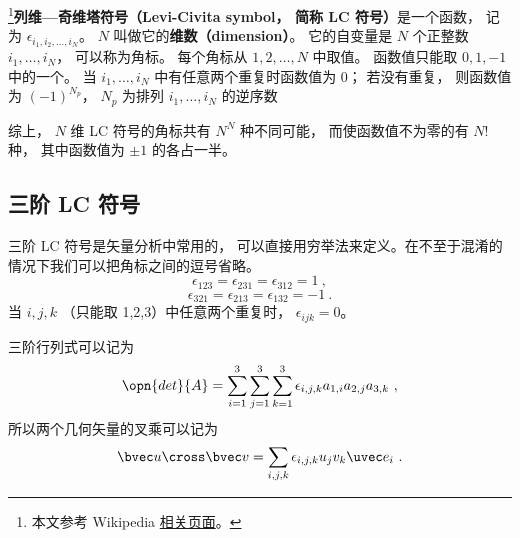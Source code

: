 

\footnote{本文参考 Wikipedia \href{https://en.wikipedia.org/wiki/Levi-Civita_symbol}{相关页面}。}\textbf{列维—奇维塔符号（Levi-Civita symbol， 简称 LC 符号）}是一个函数， 记为 $\epsilon_{i_1, i_2, \dots, i_N}$。 $N$ 叫做它的\textbf{维数（dimension）}。 它的自变量是 $N$ 个正整数 $i_1, \dots, i_N$， 可以称为角标。 每个角标从 $1, 2, \dots, N$ 中取值。 函数值只能取 $0, 1, -1$ 中的一个。 当 $i_1, \dots, i_N$ 中有任意两个重复时函数值为 0； 若没有重复， 则函数值为 $(-1)^{N_p}$， $N_p$ 为排列 $i_1, \dots, i_N$ 的逆序数

综上， $N$ 维 LC 符号的角标共有 $N^N$ 种不同可能， 而使函数值不为零的有 $N!$ 种， 其中函数值为 $\pm 1$ 的各占一半。

\subsection{三阶 LC 符号}
三阶 LC 符号是矢量分析中常用的， 可以直接用穷举法来定义。在不至于混淆的情况下我们可以把角标之间的逗号省略。
\begin{equation}
\epsilon_{123} = \epsilon_{231} = \epsilon_{312} = 1~,
\end{equation}
\begin{equation}
\epsilon_{321} = \epsilon_{213} = \epsilon_{132} = -1~.
\end{equation}
当 $i,j,k$ （只能取 1,2,3）中任意两个重复时， $\epsilon_{ijk} = 0$。

三阶行列式可以记为
\begin{equation}
\opn{det}{A} = \sum_{i = 1}^3 \sum_{j = 1}^3 \sum_{k = 1}^3 \epsilon_{i,j,k} a_{1,i} a_{2,j} a_{3,k}~,
\end{equation}
所以两个几何矢量的叉乘可以记为
\begin{equation}
\bvec u \cross \bvec v = \sum_{i,j,k} \epsilon_{i,j,k} u_j v_k \uvec e_i~.
\end{equation}
